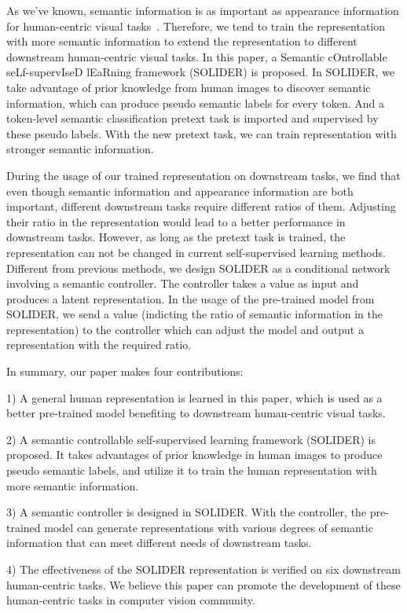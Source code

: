 \documentclass[10pt,twocolumn,letterpaper]{article}
\begin{document}
As we've known, semantic information is as important as appearance information for human-centric visual tasks~\cite{liu2019braidnet,isp,jin2020semantics}. Therefore, we tend to train the representation with more semantic information to extend the representation to different downstream human-centric visual tasks. 
In this paper,  a Semantic cOntrollable seLf-supervIseD lEaRning framework (SOLIDER) is proposed.
In SOLIDER, we take advantage of prior knowledge from human images to discover semantic information, which can produce pseudo semantic labels for every token. And a token-level semantic classification pretext task is imported and supervised by these pseudo labels.
With the new pretext task, we can train representation with stronger semantic information. 

During the usage of our trained representation on downstream tasks, we find that even though semantic information and appearance information are both important, different downstream tasks require different ratios of them. 
Adjusting their ratio in the representation would lead to a better performance in downstream tasks. However, as long as the pretext task is trained, the representation can not be changed in current self-supervised learning methods. 
Different from previous methods, we design SOLIDER as a conditional network involving a semantic controller. 
The controller takes a value as input and produces a latent representation.
In the usage of the pre-trained model from SOLIDER, we send a value (indicting the ratio of semantic information in the representation) to the controller which can adjust the model and output a representation with the required ratio.

In summary, our paper makes four contributions:

1) A general human representation is learned in this paper, which is used as a better pre-trained model benefiting to downstream human-centric visual tasks.

2) A semantic controllable self-supervised learning framework (SOLIDER) is proposed. It takes advantages of prior knowledge in human images to produce pseudo semantic labels, and utilize it to train the human representation with more semantic information.

3) A semantic controller is designed in SOLIDER. With the controller, the pre-trained model can generate representations with various degrees of semantic information that can meet different needs of downstream tasks.

4) The effectiveness of the SOLIDER representation is verified on six downstream human-centric tasks. 
We believe this paper can promote the development of these human-centric tasks in computer vision community.
\end{document}
